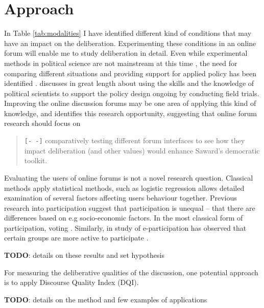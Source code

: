\documentclass[journal,a4paper]{IEEEtran}
\begin{document}
\section{Approach}

In Table \ref{tab:modalities} I have identified different kind of conditions that may have an impact on the deliberation. Experimenting these conditions in an online forum will enable me to study deliberation in detail. Even while experimental methods in political science are not mainstream at this time \cite{green03,druckman06}, the need for comparing different situations and providing support for applied policy has been identified \cite{stoker10}.  discusses in great length about using the skills and the knowledge of political scientists to support the policy design ongoing by conducting field trials. Improving the online discussion forums may be one area of applying this kind of knowledge, and  identifies this research opportunity, suggesting that online forum research should focus on

\begin{quote}
\texttt{[- -]} comparatively testing different forum interfaces to see how they impact deliberation (and other values) would 
enhance Saward’s democratic toolkit.
\end{quote}

Evaluating the users of online forums is not a novel research question. Classical methods apply statistical methods, such as logistic regression allows detailed examination of several factors affecting users behaviour together. Previous research into participation suggest that participation is unequal -- that there are differences based on e.g socio-economic factors. In the most classical form of participation, voting . Similarly, in study of e-participation has observed that certain groups are more active to participate \cite{albrecht06,strandberg08}.

\textbf{TODO}: details on these results and set hypothesis

For measuring the deliberative qualities of the discussion, one potential approach is to apply  Discourse Quality Index (DQI).

\textbf{TODO}: details on the method and few examples of applications



\end{document}
